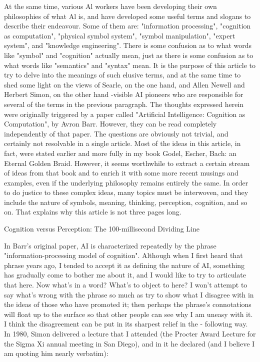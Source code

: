          At the same time, various Al workers have been developing their own
philosophies of what Al is, and have developed some useful terms and slogans to
describe their endeavour. Some of them are: "information processing", "cognition as
computation", "physical symbol system", "symbol manipulation", "expert system",
and "knowledge engineering". There is some confusion as to what words like
"symbol" and "cognition" actually mean, just as there is some confusion as to what
words like "semantics" and "syntax" mean.
         It is the purpose of this article to try to delve into the meanings of such elusive
terms, and at the same time to shed some light on the views of Searle, on the one
hand, and Allen Newell and Herbert Simon, on the other hand -visible AI pioneers
who are responsible for several of the terms in the previous paragraph. The thoughts
expressed herein were originally triggered by a paper called "Artificial Intelligence:
Cognition as Computation", by Avron Barr. However, they can be read completely
independently of that paper.
         The questions are obviously not trivial, and certainly not resolvable in a single
article. Most of the ideas in this article, in fact, were stated earlier and more fully in
my book Godel, Escher, Bach: an Eternal Golden Braid. However, it seems
worthwhile to extract a certain stream of ideas from that book and to enrich it with
some more recent musings and examples, even if the underlying philosophy remains
entirely the same. In order to do justice to these complex ideas, many topics must be
interwoven, and they include the nature of symbols, meaning, thinking, perception,
cognition, and so on. That explains why this article is not three pages long.

                            Cognition versus Perception:
                          The 100-millisecond Dividing Line

       In Barr's original paper, AI is characterized repeatedly by the phrase
"information-processing model of cognition". Although when I first heard that phrase
years ago, I tended to accept it as defining the nature of AI, something has gradually
come to bother me about it, and I would like to try to articulate that here. Now what's
in a word? What's to object to here? I won't attempt to say what's wrong with the
phrase so much as try to show what I disagree with in the ideas of those who have
promoted it; then perhaps the phrase's connotations will float up to the surface so that
other people can see why I am uneasy with it.
       I think the disagreement can be put in its sharpest relief in the - following way.
In 1980, Simon delivered a lecture that I attended (the Procter Award Lecture for the
Sigma Xi annual meeting in San Diego), and in it he declared (and I believe I am
quoting him nearly verbatim):


